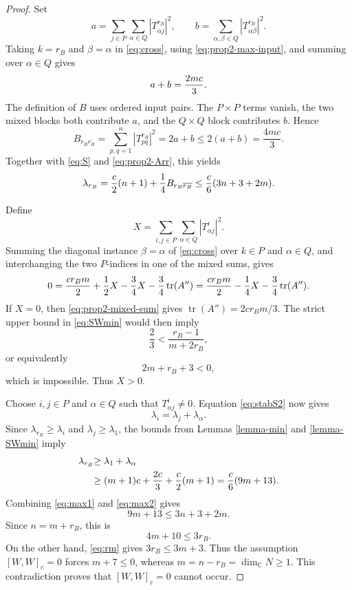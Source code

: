 \documentclass[10pt,a4paper]{amsart}
\newcommand{\C}{{\mathbb C}}
\begin{document}
\begin{proof}
{Set
}\[
 {a=\sum_{j\in P}\sum_{\alpha\in Q}|T^{r_B}_{\alpha j}|^2,
 \qquad
 b=\sum_{\alpha,\beta\in Q}|T^{r_B}_{\alpha\beta}|^2.
}\]
{Taking $k=r_B$ and $\beta=\alpha$ in \eqref{eq:cross}, using
\eqref{eq:prop2-max-input}, and summing over $\alpha\in Q$ gives
}\begin{equation}{\label{eq:prop2-ab}
 a+b=\frac{2mc}{3}.
}\end{equation}
{The definition of $B$ uses ordered input pairs. The $P\times P$
terms vanish, the two mixed blocks both contribute $a$, and the
$Q\times Q$ block contributes $b$. Hence
}\[
 {B_{r_B\overline{r_B}}
 =\sum_{p,q=1}^n|T^{r_B}_{pq}|^2
 =2a+b
 \leq2(a+b)=\frac{4mc}{3}.
}\]
{Together with \eqref{eq:S} and \eqref{eq:prop2-Arr}, this yields
}\begin{equation}{\label{eq:max1}
 \lambda_{r_B}
 =\frac{c}{2}(n+1)+\frac{1}{4}B_{r_B\overline{r_B}}
 \leq\frac{c}{6}(3n+3+2m).
}\end{equation}

{Define
}\[
{X=\sum_{i,j\in P}\sum_{\alpha\in Q}|T^i_{\alpha j}|^2.
}\]
{Summing the diagonal instance $\beta=\alpha$ of \eqref{eq:cross}
over } $k\in P$   {and $\alpha\in Q$, and interchanging the two $P$-indices
in one of the mixed sums, gives
}\begin{equation}{\label{eq:prop2-mixed-sum}
 0=\frac{cr_Bm}{2}+\frac{1}{2}X-\frac{3}{4}X-\frac{3}{4}\operatorname{tr}(A'')
  =\frac{cr_Bm}{2}-\frac{1}{4}X-\frac{3}{4}\operatorname{tr}(A'').
}\end{equation}
If   {$X=0$, then \eqref{eq:prop2-mixed-sum} gives
$\operatorname{tr}(A'')=2cr_Bm/3$. The strict upper bound in \eqref{eq:SWmin} would then
imply
}\[
{\frac{2}{3}<
 \frac{r_B-1}{m+2r_B},
}\]
{or equivalently
}\[
{2m+r_B+3<0,
}\]
which is   {impossible. Thus $X>0$.
}

{Choose } $i,j\in P$ and   {$\alpha\in Q$ such that
$T^i_{\alpha j}\neq0$. Equation \eqref{eq:stabS2} now gives
}\[
{\lambda_i=\lambda_j+\lambda_\alpha.
}\]
{Since $\lambda_{r_B}\geq\lambda_i$ and $\lambda_j\geq\lambda_1$, the
bounds from Lemmas \ref{lemma-min} and \ref{lemma-SWmin} imply
}\begin{align}
{\lambda_{r_B}
 }&{\geq\lambda_1+\lambda_\alpha \notag}\\
 &{\geq (m+1)c+\frac{2c}{3}
       +\frac{c}{2}(m+1)
 =\frac{c}{6}(9m+13).
 \label{eq:max2}
}\end{align}
{Combining \eqref{eq:max1} and \eqref{eq:max2} gives
}\[
{9m+13\leq3n+3+2m.
}\]
{Since $n=m+r_B$, this is
}\[
{4m+10\leq3r_B.
}\]
 On the other hand,  {\eqref{eq:rm} gives $3r_B\leq3m+3$. Thus the
assumption $[W,W]_c=0$ forces $m+7\leq0$, whereas
$m=n-r_B=\dim_{\C}N\geq1$. This contradiction proves that
$[W,W]_c=0$ cannot occur.}
\end{proof}
\end{document}
